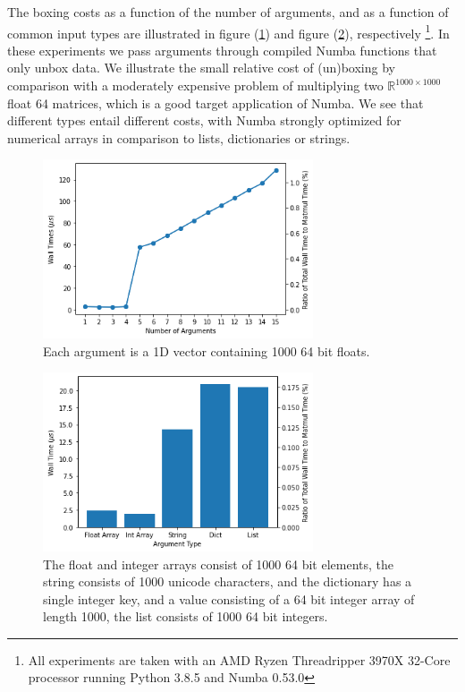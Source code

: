 \documentclass{IEEEcsmag}
\begin{document}
The boxing costs as a function of the number of arguments, and as a function of common input types are illustrated in figure (\ref{fig:boxing_cost_nargs}) and figure (\ref{fig:boxing_cost_types}), respectively \footnote{All experiments are taken with an AMD Ryzen Threadripper 3970X 32-Core processor running Python 3.8.5 and Numba 0.53.0}. In these experiments we pass arguments through compiled Numba functions that only unbox data. We illustrate the small relative cost of (un)boxing by comparison with a moderately expensive problem of multiplying two $\mathbb{R}^{1000 \times 1000}$ float 64 matrices, which is a good target application of Numba. We see that different types entail different costs, with Numba strongly optimized for numerical arrays in comparison to lists, dictionaries or strings.

\begin{figure}
	\centerline{\includegraphics[width=8cm]{figures/boxing_cost_nargs.png}}
	\caption{Each argument is a 1D vector containing 1000 64 bit floats.}
	\label{fig:boxing_cost_nargs}
\end{figure}

\begin{figure}
	\centerline{\includegraphics[width=8cm]{figures/boxing_cost_types.png}}
	\caption{The float and integer arrays consist of 1000 64 bit elements, the string consists of 1000 unicode characters, and the dictionary has a single integer key, and a value consisting of a 64 bit integer array of length 1000, the list consists of 1000 64 bit integers.}
	\label{fig:boxing_cost_types}
\end{figure}
\end{document}
